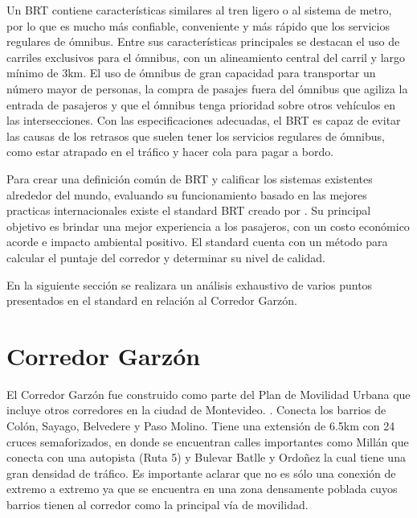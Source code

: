 Un BRT contiene características similares al tren ligero o al sistema de metro, por lo que es mucho más confiable, conveniente y más rápido que los servicios regulares de ómnibus. Entre sus características principales se destacan el uso de carriles exclusivos para el ómnibus, con un alineamiento central del carril y largo mínimo de 3km. El uso de ómnibus de gran capacidad para transportar un número mayor de personas, la compra de pasajes fuera del ómnibus que agiliza la entrada de pasajeros y que el ómnibus tenga prioridad sobre otros vehículos en las intersecciones. Con las especificaciones adecuadas, el BRT es capaz de evitar las causas de los retrasos que suelen tener los servicios regulares de ómnibus, como estar atrapado en el tráfico y hacer cola para pagar a bordo. 

Para crear una definición común de BRT y calificar los sistemas existentes alrededor del mundo,  evaluando su funcionamiento basado en las mejores practicas internacionales existe el standard BRT creado por \citet{brt_standar}. Su principal objetivo es brindar una mejor experiencia a los pasajeros, con un costo económico acorde e impacto ambiental positivo. El standard cuenta con un método para calcular el puntaje del corredor y determinar su nivel de calidad. 

En la siguiente sección se realizara un análisis exhaustivo de varios puntos presentados en el standard en relación al Corredor Garzón.

	
\section{Corredor Garzón}	


El Corredor Garzón fue construido como parte del Plan de Movilidad Urbana que incluye otros corredores en la ciudad de Montevideo. \citep{PlanMovilidad}. Conecta los barrios de Colón, Sayago, Belvedere y Paso Molino. Tiene una extensión de 6.5km con 24 cruces semaforizados, en donde se encuentran calles importantes como Millán que conecta con una autopista (Ruta 5) y Bulevar Batlle y Ordoñez la cual tiene una gran densidad de tráfico. Es importante aclarar que no es sólo una conexión de extremo a extremo ya que se encuentra en una zona densamente poblada cuyos barrios tienen al corredor como la principal vía de movilidad.

